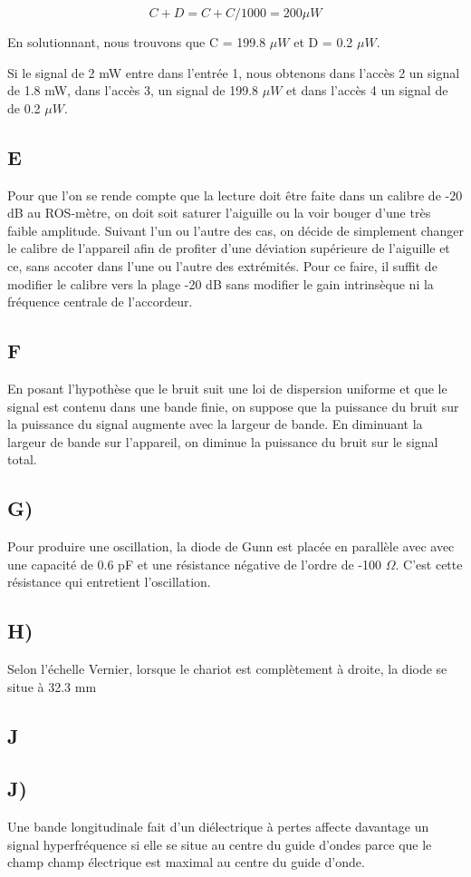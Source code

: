 \begin{equation}
	C+D = C+C/1000 = 200\mu W
\end{equation}

En solutionnant, nous trouvons que C = 199.8 $\mu W$ et D = 0.2 $\mu W$.

Si le signal de 2 mW entre dans l'entrée 1, nous obtenons dans l'accès 2 un signal de 1.8 mW, dans l'accès 3, un signal de 199.8 $\mu W$ et dans l'accès 4 un signal de de 0.2 $\mu W$.

\subsection{E}
Pour que l'on se rende compte que la lecture doit être faite dans un calibre de -20 dB au ROS-mètre, on doit soit saturer l'aiguille ou la voir bouger d'une très faible amplitude. Suivant l'un ou l'autre des cas, on décide de simplement changer le calibre de l'appareil afin de profiter d'une déviation supérieure de l'aiguille et ce, sans accoter dans l'une ou l'autre des extrémités. Pour ce faire, il suffit de modifier le calibre vers la plage -20 dB sans modifier le gain intrinsèque ni la fréquence centrale de l'accordeur. 

\subsection{F}
En posant l'hypothèse que le bruit suit une loi de dispersion uniforme et que le signal est contenu dans une bande finie, on suppose que la puissance du bruit sur la puissance du signal augmente avec la largeur de bande. En diminuant la largeur de bande sur l'appareil, on diminue la puissance du bruit sur le signal total. 

\subsection{G)}
Pour produire une oscillation, la diode de Gunn est placée en parallèle avec avec une capacité de 0.6 pF et une résistance négative de l'ordre de -100 $\Omega$. C'est cette résistance qui entretient l'oscillation.

\subsection{H)}
Selon l'échelle Vernier, lorsque le chariot est complètement à droite, la diode se situe à 32.3 mm
\subsection{J}
\subsection{J)}
Une bande longitudinale fait d’un diélectrique à pertes aﬀecte davantage un signal hyperfréquence si elle se situe au centre du guide d’ondes parce que le champ champ électrique est maximal au centre du guide d'onde. 
